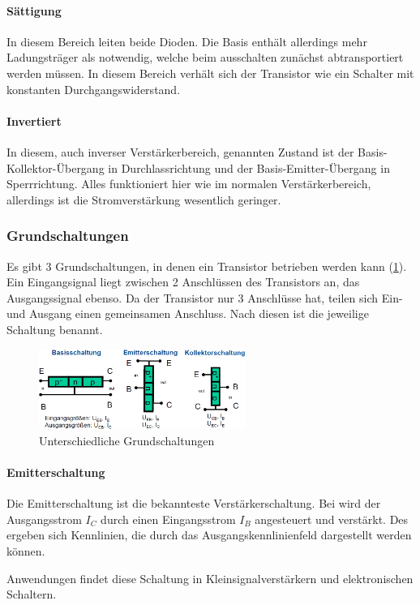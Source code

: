 	\paragraph{Sättigung} In diesem Bereich leiten beide Dioden. Die Basis enthält allerdings mehr Ladungsträger als notwendig, welche beim ausschalten zunächst abtransportiert werden müssen. In diesem Bereich verhält sich der Transistor wie ein Schalter mit konstanten Durchgangswiderstand.
	\paragraph{Invertiert} In diesem, auch inverser Verstärkerbereich, genannten Zustand ist der Basis-Kollektor-Übergang in Durchlassrichtung und der Basis-Emitter-Übergang in Sperrrichtung. Alles funktioniert hier wie im normalen Verstärkerbereich, allerdings ist die Stromverstärkung wesentlich geringer. 
	\subsubsection{Grundschaltungen}
	Es gibt 3 Grundschaltungen, in denen ein Transistor betrieben werden kann (\ref{10_schaltungen}). Ein Eingangsignal liegt zwischen 2 Anschlüssen des Transistors an, das Ausgangssignal ebenso. Da der Transistor nur 3 Anschlüsse hat, teilen sich Ein- und Ausgang einen gemeinsamen Anschluss. Nach diesen ist die jeweilige Schaltung benannt.
	\begin{figure}[h]
		\centering
		\includegraphics[width=0.6\textwidth]{Kapitel/Kap10/schaltungen.png}
		\caption{Unterschiedliche Grundschaltungen}
		\label{10_schaltungen}
	\end{figure}
	\paragraph{Emitterschaltung}
	Die Emitterschaltung ist die bekannteste Verstärkerschaltung. Bei wird der Ausgangsstrom $I_C$ durch einen Eingangsstrom $I_B$ angesteuert und verstärkt. Des ergeben sich Kennlinien, die durch das Ausgangskennlinienfeld dargestellt werden können.
	
	Anwendungen findet diese Schaltung in Kleinsignalverstärkern und elektronischen Schaltern.
	
